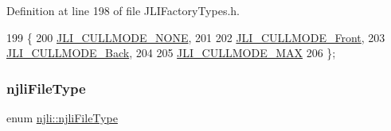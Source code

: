 Definition at line 198 of file J\+L\+I\+Factory\+Types.\+h.


\begin{DoxyCode}
199   \{
200     \mbox{\hyperlink{namespacenjli_a2247adafa5de18bc18550918b4ed48d8a0ed241aa52ddf23fe7df9a6e601075da}{JLI\_CULLMODE\_NONE}},
201 
202     \mbox{\hyperlink{namespacenjli_a2247adafa5de18bc18550918b4ed48d8a1468fb816881c98261f8b3b96a256cbc}{JLI\_CULLMODE\_Front}},
203     \mbox{\hyperlink{namespacenjli_a2247adafa5de18bc18550918b4ed48d8a45096d6a80396c7d05b5c8a0dbb62084}{JLI\_CULLMODE\_Back}},
204 
205     \mbox{\hyperlink{namespacenjli_a2247adafa5de18bc18550918b4ed48d8ad400392e1eebc023e18b265a8a534d32}{JLI\_CULLMODE\_MAX}}
206   \};
\end{DoxyCode}
\mbox{\label{namespacenjli_a3699b2e13e71094f00d7f0141e131106}} 
\subsubsection{\texorpdfstring{njli\+File\+Type}{njliFileType}}
{\footnotesize\ttfamily enum \mbox{\hyperlink{namespacenjli_a3699b2e13e71094f00d7f0141e131106}{njli\+::njli\+File\+Type}}}


